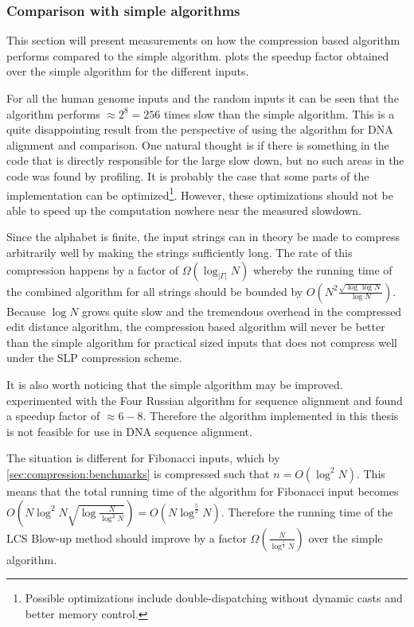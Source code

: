 \documentclass[twoside,11pt,openright]{report}
\begin{document}
\subsubsection{Comparison with simple algorithms}
This section will present measurements on how the compression based algorithm performs compared to the simple algorithm.  plots the speedup factor obtained over the simple algorithm for the different inputs.

For all the human genome inputs and the random inputs it can be seen that the algorithm performs $\approx 2^{8} = 256$ times slow than the simple algorithm. This is a quite disappointing result from the perspective of using the algorithm for DNA alignment and comparison. One natural thought is if there is something in the code that is directly responsible for the large slow down, but no such areas in the code was found by profiling. It is probably the case that some parts of the implementation can be optimized\footnote{Possible optimizations include double-dispatching without dynamic casts and better memory control.}. However, these optimizations should not be able to speed up the computation nowhere near the measured slowdown.

Since the alphabet is finite, the input strings can in theory be made to compress arbitrarily well by making the strings sufficiently long. The rate of this compression happens by a factor of $\Omega(\log_{|\Gamma|}{N})$ whereby the running time of the combined algorithm for all strings should be bounded by $O\left( N^2 \frac{\sqrt{\log{\log{N}}}}{\log{N}} \right)$. Because $\log{N}$ grows quite slow and the tremendous overhead in the compressed edit distance algorithm, the compression based algorithm will never be better than the simple algorithm for practical sized inputs that does not compress well under the SLP compression scheme.

It is also worth noticing that the simple algorithm may be improved. \cite{LasseFourRussian} experimented with the Four Russian algorithm for sequence alignment and found a speedup factor of $\approx 6-8$. Therefore the algorithm implemented in this thesis is not feasible for use in DNA sequence alignment.

The situation is different for Fibonacci inputs, which by \cref{sec:compression:benchmarks} is compressed such that $n = O(\log^2{N})$. This means that the total running time of the algorithm for Fibonacci input becomes $O\left( N\log^2{N} \sqrt{\log{\frac{N}{\log^2{N}}}} \right) = O(N\log^{\frac{5}{2}}{N})$. Therefore the running time of the LCS Blow-up method should improve by a factor $\Omega\left( \frac{N}{\log^{\frac{5}{2}}{N}} \right)$ over the simple algorithm.
\end{document}
